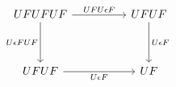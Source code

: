 \[\begin{tikzcd}
	UFUFUF && UFUF \\
	\\
	UFUF && UF
	\arrow["{UFU\epsilon F}", from=1-1, to=1-3]
	\arrow["{U\epsilon FUF}"', from=1-1, to=3-1]
	\arrow["{U\epsilon F}", from=1-3, to=3-3]
	\arrow["{U\epsilon F}"', from=3-1, to=3-3]
\end{tikzcd}\]